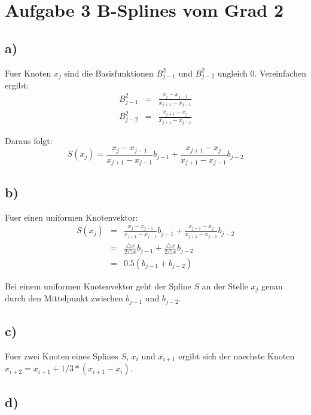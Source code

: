 
\section*{Aufgabe 3 B-Splines vom Grad 2}

\subsection*{a)}
Fuer Knoten $x_j$ sind die Basisfunktionen $B^2_{j-1}$ und $B^2_{j-2}$ ungleich $0$. Vereinfachen ergibt:
\begin{eqnarray}
    B^2_{j-1}&=& \frac{x_j - x_{j-1}}{x_{j+1} - x_{j-1}} \\
    B^2_{j-2}&=& \frac{x_{j+1} - x_{j}}{x_{j+1} - x_{j-1}}
\end{eqnarray}

Daraus folgt: 
\begin{equation}
    S(x_j) = \frac{x_j - x_{j-1}}{x_{j+1} - x_{j-1}} b_{j-1} +  \frac{x_{j+1} - x_{j}}{x_{j+1} - x_{j-1}} b_{j-2}
\end{equation}



\subsection*{b)}

Fuer einen uniformen Knotenvektor:
\begin{eqnarray}
    S(x_j) &=& \frac{x_j - x_{j-1}}{x_{j+1} - x_{j-1}} b_{j-1} +  \frac{x_{j+1} - x_{j}}{x_{j+1} - x_{j-1}} b_{j-2} \\
     &=& \frac{\triangle x}{2 \triangle x} b_{j-1} +  \frac{\triangle x}{2 \triangle x} b_{j-2} \\
      &=& 0.5 ( b_{j-1} + b_{j-2}) 
\end{eqnarray}

Bei einem uniformen Knotenvektor geht der Spline $S$ an der Stelle $x_j$ genau durch den Mittelpunkt zwischen $b_{j-1}$ und  $b_{j-2}$.




\subsection*{c)}
Fuer zwei Knoten eines Splines $S$, $x_i$ und $x_{i+1}$ ergibt sich der  naechste Knoten $x_{i+2} = x_{i+1} + 1/3 *( x_{i+1} - x_i)$.

\subsection*{d)}

